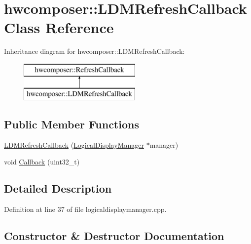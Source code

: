 \hypertarget{classhwcomposer_1_1LDMRefreshCallback}{}\section{hwcomposer\+:\+:L\+D\+M\+Refresh\+Callback Class Reference}
\label{classhwcomposer_1_1LDMRefreshCallback}
Inheritance diagram for hwcomposer\+:\+:L\+D\+M\+Refresh\+Callback\+:\begin{figure}[H]
\begin{center}
\leavevmode
\includegraphics[height=2.000000cm]{classhwcomposer_1_1LDMRefreshCallback}
\end{center}
\end{figure}
\subsection*{Public Member Functions}
\begin{DoxyCompactItemize}
\item 
\mbox{\hyperlink{classhwcomposer_1_1LDMRefreshCallback_a6e7760306abac2b5b8715be31c99fe49}{L\+D\+M\+Refresh\+Callback}} (\mbox{\hyperlink{classhwcomposer_1_1LogicalDisplayManager}{Logical\+Display\+Manager}} $\ast$manager)
\item 
void \mbox{\hyperlink{classhwcomposer_1_1LDMRefreshCallback_a0bc9239fba543393d72ea68f9ee5abab}{Callback}} (uint32\+\_\+t)
\end{DoxyCompactItemize}


\subsection{Detailed Description}


Definition at line 37 of file logicaldisplaymanager.\+cpp.



\subsection{Constructor \& Destructor Documentation}
\mbox{\label{classhwcomposer_1_1LDMRefreshCallback_a6e7760306abac2b5b8715be31c99fe49}} 
